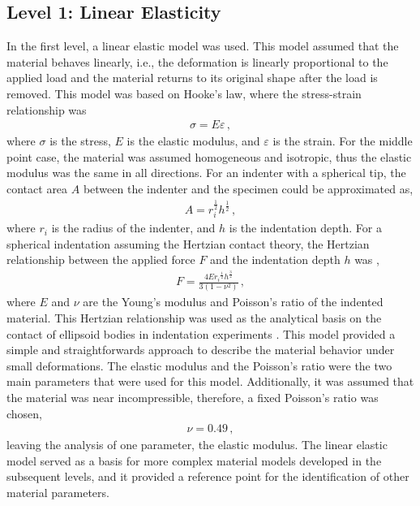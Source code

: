 \subsection{Level 1: Linear Elasticity}
In the first level, a linear elastic model was used. This model assumed that the material behaves linearly, 
i.e., the deformation is linearly proportional to the applied load and the material returns to its original 
shape after the load is removed. This model was based on Hooke's law, where the stress-strain relationship was 
\begin{align}
    \sigma = E\varepsilon \, ,
\end{align}
where $\sigma$ is the stress, $E$ is the elastic modulus, and $\varepsilon$ is the strain. 
For the middle point case, the material was assumed homogeneous and isotropic, thus the elastic modulus was the 
same in all directions. 
For an indenter with a spherical tip, the contact area $A$ between the indenter and the specimen could be approximated as, 
\begin{align}
    A = r_i^{\frac{1}{2}} h^{\frac{1}{2}} \, ,
\end{align}
where $r_i$ is the radius of the indenter, and $h$ is the indentation depth.
For a spherical indentation assuming the Hertzian contact theory, the Hertzian relationship 
between the applied force $F$ and the indentation depth $h$ was \cite{Lin2009}, 
\begin{align}
    F = \frac{4E{r_i}^{\frac{1}{2}} {h}^{\frac{3}{2}}}{3(1-\nu^2)} \, ,
    \label{eq:forcelinear}
\end{align}
where $E$ and $\nu$ are the Young's modulus and Poisson's ratio of the indented material.
This Hertzian relationship was used as the analytical basis on the contact of ellipsoid bodies in 
indentation experiments \cite{Lin2009}.
This model provided a simple and straightforwards approach to describe the material behavior under 
small deformations. The elastic modulus and the Poisson's ratio were the two main parameters 
that were used for this model. Additionally, it was assumed that the material was near incompressible,
therefore, a fixed Poisson's ratio was chosen, 
\begin{align}
    \nu = 0.49 \, ,
\end{align}
leaving the analysis of one parameter, the elastic modulus. The linear elastic model served as a basis for more 
complex material models developed in the subsequent levels, and it provided a reference point for 
the identification of other material parameters.


